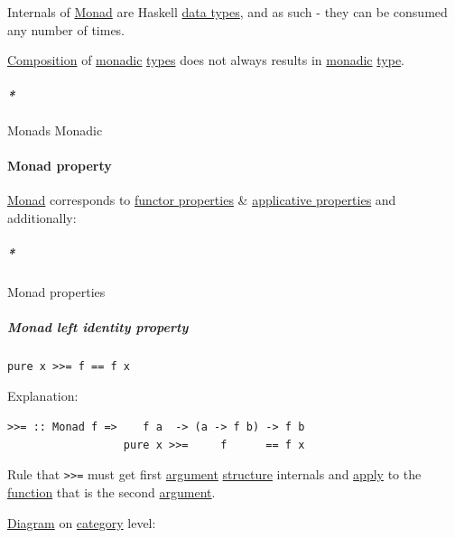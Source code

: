 \documentclass[a4paper,14pt,oneside]{book}
\begin{document}
Internals of \hyperref[org3b2177c]{Monad} are Haskell \hyperref[org7d4ea11]{data types}, and as such - they can be consumed any number of times.

\hyperref[org6a6c663]{Composition} of \hyperref[org748ccf9]{monadic} \hyperref[org40b6d66]{types} does not always results in \hyperref[org748ccf9]{monadic} \hyperref[org4e3af4c]{type}.

\paragraph{\emph{*}}
\label{sec:org5fb5c8c}

\label{org9cdb995}Monads
\label{org748ccf9}Monadic

\paragraph{\label{org95c0f01}Monad property}
\label{sec:org7ff2553}
\hyperref[org3b2177c]{Monad} corresponds to \hyperref[org849cfaf]{functor properties} \& \hyperref[org6758b33]{applicative properties} and additionally:

\subparagraph{\emph{*}}
\label{sec:org8158378}
\label{orga0629ac}Monad properties

\subparagraph{\label{org99eec4a}Monad left identity property}
\label{sec:org9d8b5cb}
\begin{verbatim}
pure x >>= f == f x
\end{verbatim}

Explanation:
\begin{verbatim}
>>= :: Monad f =>    f a  -> (a -> f b) -> f b
                  pure x >>=     f      == f x
\end{verbatim}

Rule that \texttt{>>=} must get first \hyperref[org511ee69]{argument} \hyperref[org3025fd4]{structure} internals and \hyperref[orgb6aa112]{apply} to the \hyperref[orgaa71573]{function} that is the second \hyperref[org511ee69]{argument}.

\hyperref[org1854dcc]{Diagram} on \hyperref[orgfd021ba]{category} level:
\end{document}
